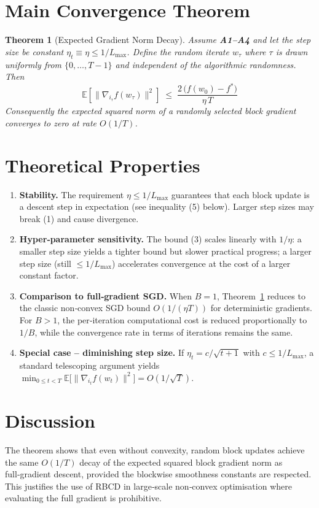 \documentclass{article}
\newtheorem{theorem}{Theorem}
\begin{document}
\section*{Main Convergence Theorem}
\begin{theorem}[Expected Gradient Norm Decay]\label{thm:main}
Assume \textbf{A1–A4} and let the step size be constant $\eta_{t}\equiv\eta\le 1/L_{\max}$.  
Define the random iterate $w_{\tau}$ where $\tau$ is drawn uniformly from $\{0,\dots ,T-1\}$ and independent of the algorithmic randomness. Then
\[
\boxed{
\mathbb{E}\!\left[\big\|\nabla_{i_{\tau}}f(w_{\tau})\big\|^{2}\right]
\;\le\;
\frac{2\,\big(f(w_{0})-f^{*}\big)}{\eta\,T}
}
\tag{3}
\]
Consequently the expected squared norm of a randomly selected block gradient converges to zero at rate $O(1/T)$.
\end{theorem}

\section*{Theoretical Properties}
\begin{enumerate}[label=\textbf{P\arabic*:}, leftmargin=*]
\item \textbf{Stability.} The requirement $\eta\le 1/L_{\max}$ guarantees that each block update is a descent step in expectation (see inequality (5) below). Larger step sizes may break (1) and cause divergence.
\item \textbf{Hyper‑parameter sensitivity.} The bound (3) scales linearly with $1/\eta$: a smaller step size yields a tighter bound but slower practical progress; a larger step size (still $\le 1/L_{\max}$) accelerates convergence at the cost of a larger constant factor.
\item \textbf{Comparison to full‑gradient SGD.} When $B=1$, Theorem~\ref{thm:main} reduces to the classic non‑convex SGD bound $O(1/(\eta T))$ for deterministic gradients. For $B>1$, the per‑iteration computational cost is reduced proportionally to $1/B$, while the convergence rate in terms of iterations remains the same.
\item \textbf{Special case – diminishing step size.} If $\eta_{t}=c/\sqrt{t+1}$ with $c\le 1/L_{\max}$, a standard telescoping argument yields $\min_{0\le t<T}\mathbb{E}\!\big[\|\nabla_{i_{t}}f(w_{t})\|^{2}\big]=O(1/\sqrt{T})$.
\end{enumerate}

\section*{Discussion}
The theorem shows that even without convexity, random block updates achieve the same $O(1/T)$ decay of the expected squared block gradient norm as full‑gradient descent, provided the blockwise smoothness constants are respected. This justifies the use of RBCD in large‑scale non‑convex optimisation where evaluating the full gradient is prohibitive.
\end{document}
